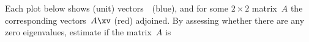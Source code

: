 \begin{exercise}  
Each plot below shows (unit) vectors~\xv\ (blue), and for some \(2\times 2\) matrix~\(A\) the corresponding vectors~\(A\xv\) (red) adjoined. 
By assessing whether there are any zero eigenvalues, estimate if the matrix~\(A\) is  

\begin{Parts}
\item{}%

\item{}

\begin{OmitV1}
\item{}

\item{}%
\end{OmitV1}

\item{}

\item{}

\end{Parts}
\end{exercise}


